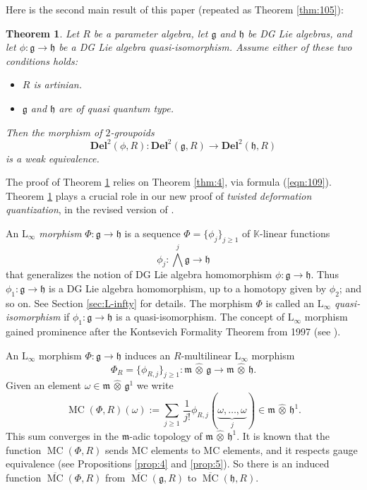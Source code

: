 \documentclass[a4paper,10pt]{amsart}
\newtheorem{thm}[equation]{Theorem}
\theoremstyle{definition}
\numberwithin{equation}{section}
\newcommand{\opn}{\operatorname}
\newcommand{\ol}{\overline}
\newcommand{\rmitem}[1]{\item[\text{\textup{(#1)}}]}
\newcommand{\mfrak}[1]{\mathfrak{#1}}
\newcommand{\mbf}[1]{\mathbf{#1}}
\newcommand{\mrm}[1]{\mathrm{#1}}
\newcommand{\mbb}[1]{\mathbb{#1}}
\newcommand{\smfrac}[2]{\textstyle \frac{#1}{#2}}
\newcommand{\tup}[1]{\textup{#1}}
\newcommand{\what}[1]{\widehat{#1}}
\newcommand{\hatotimes}{\, \what{\otimes} \,}
\newcommand{\hot}{\hatotimes}
\newcommand{\K}{\mbb{K}}
\newcommand{\g}{\mfrak{g}}
\newcommand{\m}{\mfrak{m}}
\newcommand{\h}{\mfrak{h}}
\newcommand{\bwedge}{{\textstyle \bigwedge}}
\newcommand{\om}{\omega}
\begin{document}
Here is the second main result of this paper (repeated as Theorem
\ref{thm:105}):

\begin{thm} \label{thm:107}
Let $R$ be a parameter algebra, let $\g$ and $\h$ be
DG Lie algebras, and let $\phi : \g \to \h$ be a DG Lie algebra
quasi-isomorphism. Assume either of these two conditions holds\tup{:}
\begin{itemize}
\rmitem{i} $R$ is artinian.  
\rmitem{ii} $\g$ and $\h$ are of quasi quantum type.
\end{itemize}  
Then the morphism of $2$-groupoids
\[ \mbf{Del}^2(\phi, R) : \mbf{Del}^2(\g, R) \to \mbf{Del}^2(\h, R) \]
is a weak equivalence.
\end{thm}

The proof of Theorem \ref{thm:107} relies on Theorem \ref{thm:4}, via formula 
(\ref{eqn:109}).
Theorem \ref{thm:107} plays a crucial role in our new proof of {\em twisted
deformation quantization}, in the revised version of \cite{Ye4}.

An {\em  $\mrm{L}_{\infty}$ morphism} $\Phi : \g \to \h$ is a sequence 
$\Phi = \{ \phi_j \}_{j \geq 1}$ of $\K$-linear functions 
\[ \phi_j : \bwedge^j \g \to \h \]
that generalizes the notion of DG Lie algebra homomorphism 
$\phi : \g \to \h$. Thus $\phi_1 : \g \to \h$ is a 
DG Lie algebra homomorphism, up to a homotopy given by $\phi_2$; and so on. 
See Section \ref{sec:L-infty} for details. 
The morphism $\Phi$ is called an {\em $\mrm{L}_{\infty}$ quasi-isomorphism}
if $\phi_1 : \g \to \h$ is a quasi-isomorphism. 
The concept of $\mrm{L}_{\infty}$ morphism gained
prominence after the Kontsevich Formality Theorem from 1997 (see
\cite{Ko2}). 

An $\mrm{L}_{\infty}$ morphism $\Phi : \g \to \h$ induces an $R$-multilinear 
$\mrm{L}_{\infty}$ morphism 
\[ \Phi_R = \{ \phi_{R, j} \}_{j \geq 1} : \m \hot \g \to \m \hot \h . \]
Given an element $\om \in \m \hot \g^1$ we write
\begin{equation}
\opn{MC}(\Phi, R) (\om) :=
\sum_{j \geq 1} \, \smfrac{1}{j!} \phi_{R, j}
(\underset{j}{\underbrace{\om, \ldots, \om}}) \in \m \hot \h^1 .
\end{equation}
This sum converges in the $\m$-adic topology of $\m \hot \h^1$. 
It is known that the function $\opn{MC}(\Phi, R)$ sends MC elements to MC
elements, and it respects gauge equivalence (see Propositions \ref{prop:4}
and \ref{prop:5}).
So there is an induced function
$\ol{\opn{MC}}(\Phi, R)$ from 
$\ol{\opn{MC}}(\g, R)$ to $\ol{\opn{MC}}(\h, R).$
\end{document}
